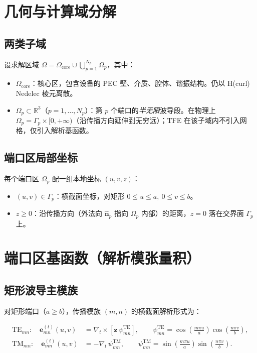 \documentclass[11pt,a4paper]{ctexart}
\newcommand{\R}{\mathbb{R}}
\begin{document}
\section{几何与计算域分解}

\subsection{两类子域}

设求解区域 $\Omega = \Omega_{\text{core}} \cup \bigcup_{p=1}^{N_p} \Omega_p$，其中：

\begin{itemize}
\item $\Omega_{\text{core}}$：核心区，包含设备的 PEC 壁、介质、腔体、谐振结构。仍以 H(curl) Nedelec 棱元离散。
\item $\Omega_p \subset \R^3$（$p = 1, \ldots, N_p$）：第 $p$ 个端口的\emph{半无限}波导段。在物理上 $\Omega_p = \Gamma_p \times [0, +\infty)$（沿传播方向延伸到无穷远）；TFE 在该子域内不引入网格，仅引入解析基函数。
\end{itemize}

\subsection{端口区局部坐标}

每个端口区 $\Omega_p$ 配一组本地坐标 $(u, v, z)$：

\begin{itemize}
\item $(u, v) \in \Gamma_p$：横截面坐标，对矩形 $0 \le u \le a,\ 0 \le v \le b$。
\item $z \ge 0$：沿传播方向（外法向 $\hat{\bm n}_p$ 指向 $\Omega_p$ 内部）的距离，$z = 0$ 落在交界面 $\Gamma_p$ 上。
\end{itemize}

\section{端口区基函数（解析模张量积）}

\subsection{矩形波导主模族}

对矩形端口（$a \ge b$），传播模族 $(m, n)$ 的横截面解析形式为：

\begin{align}
  \text{TE}_{mn}: \quad
  \bm e_{mn}^{(t)}(u, v) &= \nabla_t \times [\hat{\bm z}\,\psi_{mn}^{\text{TE}}],
    \qquad \psi_{mn}^{\text{TE}} = \cos\!\left(\frac{m\pi u}{a}\right)\cos\!\left(\frac{n\pi v}{b}\right), \\
  \text{TM}_{mn}: \quad
  \bm e_{mn}^{(t)}(u, v) &= -\nabla_t\,\psi_{mn}^{\text{TM}},
    \qquad \psi_{mn}^{\text{TM}} = \sin\!\left(\frac{m\pi u}{a}\right)\sin\!\left(\frac{n\pi v}{b}\right).
\end{align}
\end{document}
